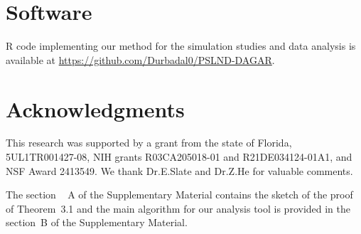 \documentclass[aoas]{imsart}
\theoremstyle{plain}
\theoremstyle{definition}
\begin{document}
























\section{Software}

R code implementing our method for the simulation studies and data analysis is available at \url{https://github.com/Durbadal0/PSLND-DAGAR}.






\section{Acknowledgments}

This research was supported by a grant from the state of Florida, 5UL1TR001427-08, NIH grants R03CA205018-01 and R21DE034124-01A1, and NSF Award 2413549. We thank Dr.E.Slate and Dr.Z.He for valuable comments.\\


\begin{supplement}
{The section ~ A of the Supplementary Material contains the sketch of the proof of Theorem~3.1 and the main algorithm for our analysis tool is provided in the section~B of the Supplementary Material.}
\end{supplement}



\printbibliography 
\end{document}
